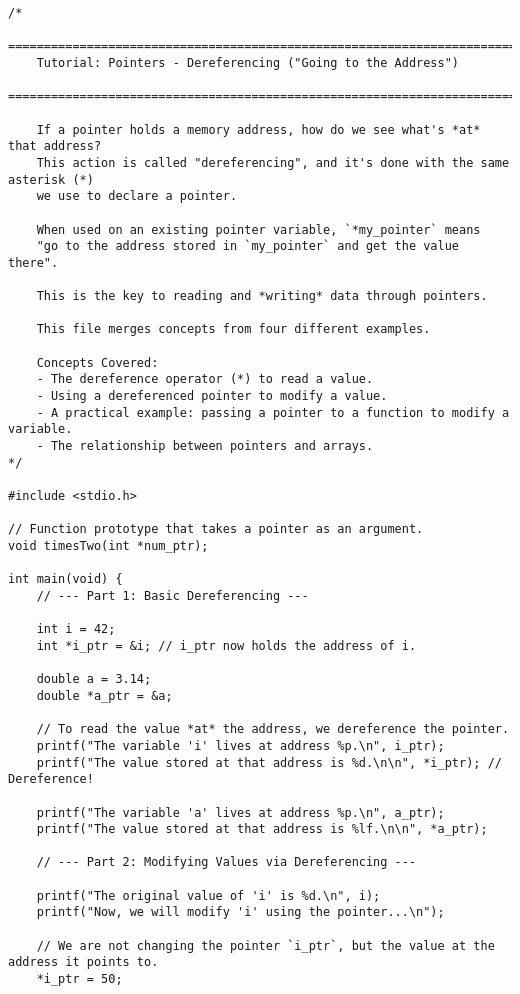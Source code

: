 \documentclass[11pt]{book}
\begin{document}
\begin{verbatim}
/*
    ================================================================================
    Tutorial: Pointers - Dereferencing ("Going to the Address")
    ================================================================================

    If a pointer holds a memory address, how do we see what's *at* that address?
    This action is called "dereferencing", and it's done with the same asterisk (*)
    we use to declare a pointer.

    When used on an existing pointer variable, `*my_pointer` means
    "go to the address stored in `my_pointer` and get the value there".

    This is the key to reading and *writing* data through pointers.

    This file merges concepts from four different examples.

    Concepts Covered:
    - The dereference operator (*) to read a value.
    - Using a dereferenced pointer to modify a value.
    - A practical example: passing a pointer to a function to modify a variable.
    - The relationship between pointers and arrays.
*/

#include <stdio.h>

// Function prototype that takes a pointer as an argument.
void timesTwo(int *num_ptr);

int main(void) {
    // --- Part 1: Basic Dereferencing ---

    int i = 42;
    int *i_ptr = &i; // i_ptr now holds the address of i.

    double a = 3.14;
    double *a_ptr = &a;

    // To read the value *at* the address, we dereference the pointer.
    printf("The variable 'i' lives at address %p.\n", i_ptr);
    printf("The value stored at that address is %d.\n\n", *i_ptr); // Dereference!

    printf("The variable 'a' lives at address %p.\n", a_ptr);
    printf("The value stored at that address is %lf.\n\n", *a_ptr);

    // --- Part 2: Modifying Values via Dereferencing ---

    printf("The original value of 'i' is %d.\n", i);
    printf("Now, we will modify 'i' using the pointer...\n");

    // We are not changing the pointer `i_ptr`, but the value at the address it points to.
    *i_ptr = 50;


\end{verbatim}
\end{document}
